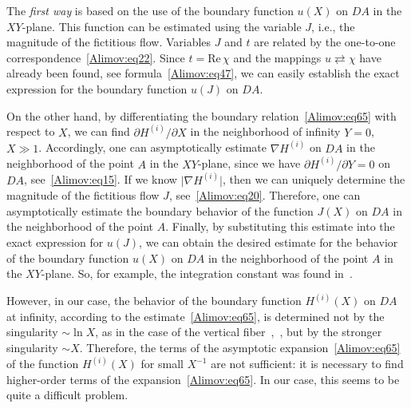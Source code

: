 \documentclass[
11pt,%
tightenlines,%
twoside,%
onecolumn,%
nofloats,%
nobibnotes,%
nofootinbib,%
superscriptaddress,%
noshowpacs,%
centertags]%
{revtex4-2}
\begin{document}
The \textit{first way} is based on the use of the boundary function $u(X)$ on $DA$ in the
$XY$-plane. This function can be estimated using the variable $J$, i.e., the magnitude of the
fictitious flow. Variables $J$ and $t$ are related by the one-to-one
correspondence~\eqref{Alimov:eq22}. Since $t = \mbox{Re}\,\chi$ and the mappings $u
\rightleftarrows \chi$ have already been found, see formula~\eqref{Alimov:eq47}, we can easily
establish the exact expression for the boundary function $u(J)$ on $DA$.

On the other hand, by differentiating the boundary relation~\eqref{Alimov:eq65} with respect to
$X$, we can find ${\partial H^{(i)}}/{\partial X}$ in the neighborhood of infinity $Y = 0$, $X \gg
1$. Accordingly, one can asymptotically estimate $\nabla H^{(i)}$ on $DA$ in the neighborhood of
the point $A$ in the $XY$-plane, since we have ${\partial H^{(i)}}/{\partial Y} = 0$ on $DA$,
see~\eqref{Alimov:eq15}. If we know $\vert \nabla H^{(i)} \vert$, then we can uniquely determine
the magnitude of the fictitious flow $J$, see~\eqref{Alimov:eq20}. Therefore, one can
asymptotically estimate the boundary behavior of the function $J(X)$ on $DA$ in the neighborhood of
the point $A$. Finally, by substituting this estimate into the exact expression for $u(J)$, we can
obtain the desired estimate for the behavior of the boundary function $u(X)$ on $DA$ in the
neighborhood of the point $A$ in the $XY$-plane. So, for example, the integration constant was
found in~\cite{Alimov:bib6}.

However, in our case, the behavior of the boundary function $H^{(i)}(X)$ on $DA$ at infinity,
according to the estimate~\eqref{Alimov:eq65}, is determined not by the singularity $\sim \ln X$,
as in the case of the vertical fiber~\cite{Alimov:bib5},~\cite{Alimov:bib6}, but by the stronger
singularity $\sim X$. Therefore, the terms of the asymptotic expansion~\eqref{Alimov:eq65} of the
function $H^{(i)}(X)$ for small $X^{-1}$ are not sufficient: it is necessary to find higher-order
terms of the expansion~\eqref{Alimov:eq65}. In our case, this seems to be quite a difficult
problem.
\end{document}
